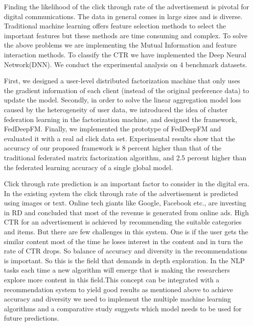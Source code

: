 \documentclass[conference]{IEEEtran}
\begin{document}
Finding the likelihood of the click through rate of the advertisement is pivotal for digital communications. The data in general comes in large sizes and is diverse. Traditional machine learning offers feature selection methods to select the important features but these methods are time consuming and complex. To solve the above problems we are implementing the Mutual Information and feature interaction methods. To classify the CTR we have implemented the Deep Neural Network(DNN). We conduct the experimental analysis on 4 benchmark datasets\cite{9750452}\cite{9239651}. 

First, we designed a user-level distributed factorization machine that only uses the gradient information of each client (instead of the original preference data) to update the model. Secondly, in order to solve the linear aggregation model loss caused by the heterogeneity of user data, we introduced the idea of cluster federation learning in the factorization machine, and designed the framework, FedDeepFM. Finally, we implemented the prototype of FedDeepFM and evaluated it with a real ad click data set. Experimental results show that the accuracy of our proposed framework is 8 percent higher than that of the traditional federated matrix factorization algorithm, and 2.5 percent higher than the federated learning accuracy of a single global model\cite{9005598}.

Click through rate prediction is an important factor to consider in the digital era. In the existing system the click through rate of the advertisement is predicted using images or text. Online tech giants like Google, Facebook etc., are investing in RD and concluded that most of the revenue is generated from online ads. High CTR for an advertisement is achieved by recommending the suitable categories and items. But there are few challenges in this system. One is if the user gets the similar content most of the time he loses interest in the content and in turn the rate of CTR drops. So balance of accuracy and diversity in the recommendations is important. So this is the field that demands in depth exploration. In the NLP tasks each time a new algorithm will emerge that is making the researchers explore more content in this field.This concept can be integrated with a recommendation system to yield good results as mentioned above to achieve accuracy and diversity we need to implement the multiple machine learning algorithms and a comparative study suggests which model needs to be used for future predictions\cite{10020981}.
\end{document}
